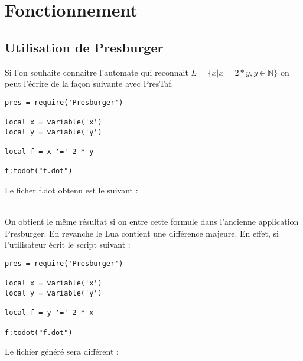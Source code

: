 \section{Fonctionnement}

\subsection{Utilisation de Presburger}

Si l'on souhaite connaitre l'automate qui reconnait $L = \{x | x = 2*y, y \in \mathbb{N} \}$ on peut l'écrire de la façon suivante avec PresTaf.\\


\begin{lstlisting}[mathescape=true, frame=single]
pres = require('Presburger')

local x = variable('x')
local y = variable('y')

local f = x '=' 2 * y 

f:todot("f.dot")
\end{lstlisting}

Le ficher f.dot obtenu est le suivant :

\vspace{0.5cm}

\\

On obtient le même résultat si on entre cette formule dans l'ancienne application Presburger. En revanche le Lua contient une différence majeure. En effet, si l'utilisateur écrit le script suivant :

\begin{lstlisting}[mathescape=true, frame=single]
pres = require('Presburger')

local x = variable('x')
local y = variable('y')

local f = y '=' 2 * x 

f:todot("f.dot")
\end{lstlisting}
\clearpage
Le fichier généré sera différent : \vspace{0.5cm}


